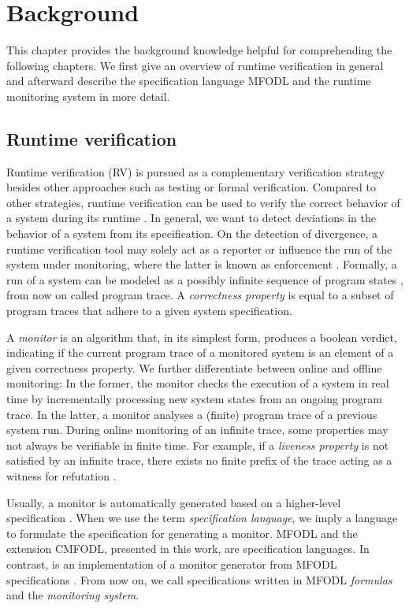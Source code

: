 \chapter{Background}
\label{chap:background}

This chapter provides the background knowledge helpful for comprehending the following chapters. We first give an overview of runtime verification in general and afterward describe the specification language MFODL and the runtime monitoring system \MonPoly in more detail.

\section{Runtime verification}
Runtime verification (RV) is pursued as a complementary verification strategy besides other approaches such as testing or formal verification. Compared to other strategies, runtime verification can be used to verify the correct behavior of a system during its runtime \cite{leuckerBriefAccountRuntime2009}. In general, we want to detect deviations in the behavior of a system from its specification. On the detection of divergence, a runtime verification tool may solely act as a reporter or influence the run of the system under monitoring, where the latter is known as enforcement \cite{leuckerBriefAccountRuntime2009}. Formally, a run of a system can be modeled as a possibly infinite sequence of program states \cite{leuckerBriefAccountRuntime2009}, from now on called program trace. A \textit{correctness property} is equal to a subset of program traces that adhere to a given system specification.

A \textit{monitor} is an algorithm that, in its simplest form, produces a boolean verdict, indicating if the current program trace of a monitored system is an element of a given correctness property. We further differentiate between online and offline monitoring: In the former, the monitor checks the execution of a system in real time by incrementally processing new system states from an ongoing program trace. In the latter, a monitor analyses a (finite) program trace of a previous system run. During online monitoring of an infinite trace, some properties may not always be verifiable in finite time. For example, if a \textit{liveness property} is not satisfied by an infinite trace, there exists no finite prefix of the trace acting as a witness for refutation \cite{havelundRuntimeVerificationPropositional2018}.

Usually, a monitor is automatically generated based on a higher-level specification \cite{leuckerBriefAccountRuntime2009}. When we use the term \textit{specification language}, we imply a language to formulate the specification for generating a monitor. MFODL and the extension CMFODL, presented in this work, are specification languages. In contrast, \MonPoly is an implementation of a monitor generator from MFODL specifications \cite{basinMonPolyMonitoringTool2017}. From now on, we call specifications written in MFODL \textit{formulas} and \MonPoly the \textit{monitoring system}.


